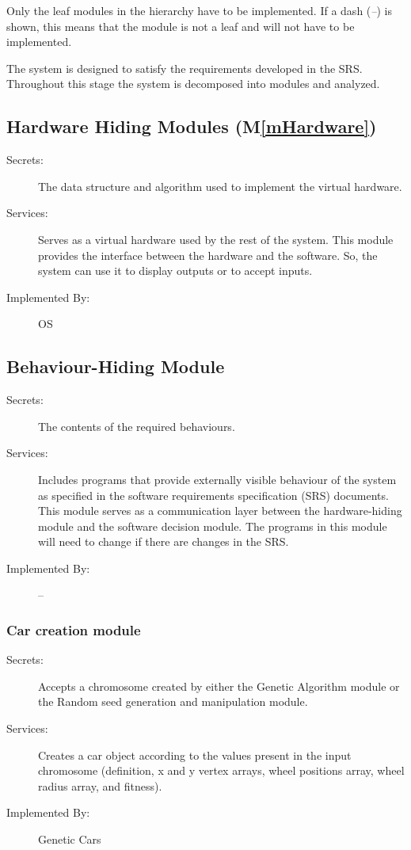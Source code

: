 \documentclass[12pt, titlepage]{article}
\newcommand{\mref}[1]{M\ref{#1}}
\begin{document}
Only the leaf modules in the
hierarchy have to be implemented. If a dash (\emph{--}) is shown, this means
that the module is not a leaf and will not have to be implemented. 

The system is designed to satisfy the requirements developed in the SRS. Throughout
this stage the system is decomposed into modules and analyzed.

\subsection{Hardware Hiding Modules (\mref{mHardware})}

\begin{description}
\item[Secrets:]The data structure and algorithm used to implement the virtual
  hardware.
\item[Services:]Serves as a virtual hardware used by the rest of the
  system. This module provides the interface between the hardware and the
  software. So, the system can use it to display outputs or to accept inputs.
\item[Implemented By:] OS
\end{description}

\subsection{Behaviour-Hiding Module}

\begin{description}
\item[Secrets:]The contents of the required behaviours.
\item[Services:]Includes programs that provide externally visible behaviour of
  the system as specified in the software requirements specification (SRS)
  documents. This module serves as a communication layer between the
  hardware-hiding module and the software decision module. The programs in this
  module will need to change if there are changes in the SRS.
\item[Implemented By:] --
\end{description}

\subsubsection{Car creation module}

\begin{description}
\item[Secrets:] Accepts a chromosome created by either the Genetic Algorithm module or the Random seed generation and manipulation module.
\item[Services:] Creates a car object according to the values present in the input chromosome (definition, x and y vertex arrays, wheel positions array, wheel radius array, and fitness).
\item[Implemented By:] Genetic Cars
\end{description}
\end{document}
